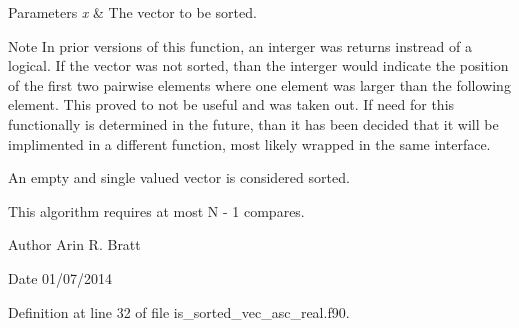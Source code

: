 \begin{DoxyParams}{Parameters}
{\em x} & The vector to be sorted.\\
\hline
\end{DoxyParams}
\begin{DoxyNote}{Note}
In prior versions of this function, an interger was returns instread of a logical. If the vector was not sorted, than the interger would indicate the position of the first two pairwise elements where one element was larger than the following element. This proved to not be useful and was taken out. If need for this functionally is determined in the future, than it has been decided that it will be implimented in a different function, most likely wrapped in the same interface.

An empty and single valued vector is considered sorted.

This algorithm requires at most N -\/ 1 compares.
\end{DoxyNote}
\begin{DoxyAuthor}{Author}
Arin R. Bratt 
\end{DoxyAuthor}
\begin{DoxyDate}{Date}
01/07/2014 
\end{DoxyDate}


Definition at line 32 of file is\-\_\-sorted\-\_\-vec\-\_\-asc\-\_\-real.\-f90.

